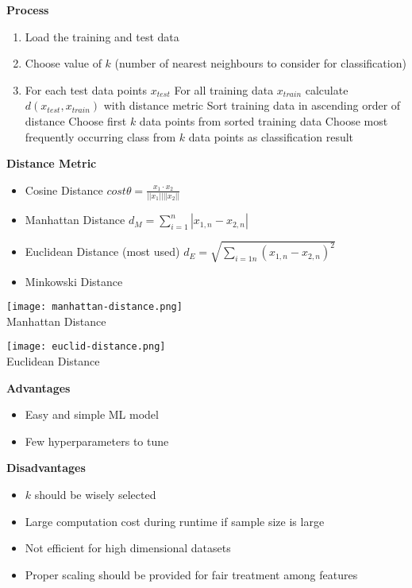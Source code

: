 \textbf{Process}
\begin{enumerate}
    \item Load the training and test data
    \item Choose value of $k$ (number of nearest neighbours to consider for classification)
    \item For each test data points $x_{test}$
        \subitem For all training data $x_{train}$ calculate $d(x_{test}, x_{train})$ with distance metric
        \subitem Sort training data in ascending order of distance
        \subitem Choose first $k$ data points from sorted training data
        \subitem Choose most frequently occurring class from $k$ data points as classification result
\end{enumerate}
\vspace{10pt}
\textbf{Distance Metric}
\begin{itemize}
    \item Cosine Distance $cost \theta = \frac{x_1 \cdot x_2}{||x_1|| ||x_2||}$
    \item Manhattan Distance $d_M = \sum_{i=1}^{n}| x_{1,n} - x_{2,n} |$
    \item Euclidean Distance (most used) $d_E = \sqrt{\sum_{i=1n}^{}(x_{1,n} - x_{2,n})^2}$
    \item Minkowski Distance
\end{itemize}

\begin{minipage}[t]{0.5\linewidth}
    \texttt{[image: manhattan-distance.png]} \\
    Manhattan Distance
\end{minipage}
\begin{minipage}[t]{0.5\linewidth}
    \texttt{[image: euclid-distance.png]} \\
    Euclidean Distance
\end{minipage}
\vspace{10pt}
\textbf{Advantages}
\begin{itemize}
    \item Easy and simple ML model
    \item Few hyperparameters to tune
\end{itemize}
\vspace{10pt}
\textbf{Disadvantages}
\begin{itemize}
    \item $k$ should be wisely selected
    \item Large computation cost during runtime if sample size is large
    \item Not efficient for high dimensional datasets
    \item Proper scaling should be provided for fair treatment among features
\end{itemize}

